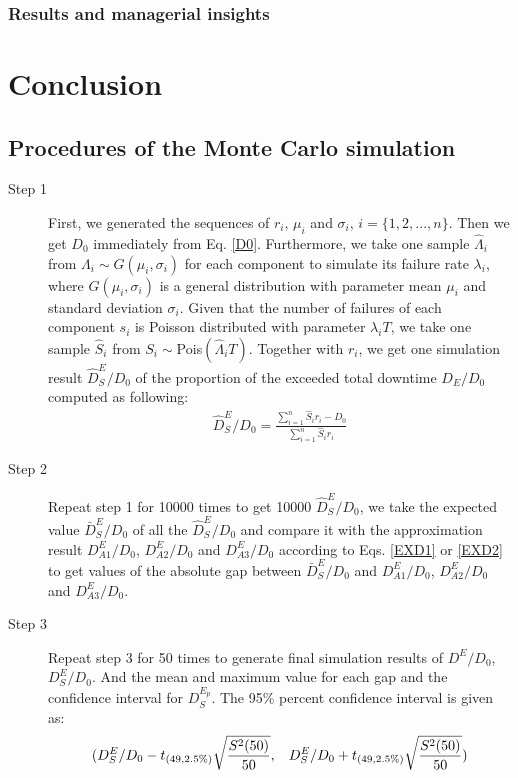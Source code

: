 \documentclass[preprint,12pt]{elsarticle}
\begin{document}
\subsubsection{Results and managerial insights}

\section{Conclusion}
\newpage
\begin{appendices}


\section{Procedures of the Monte Carlo simulation}
\label{MCP}
\begin{description}
\item[Step 1]
First, we generated the sequences of $r_{i}$, $\mu_{i}$ and $\sigma_{i}$, $i=\{1,2,...,n\}$. Then we get $D_0$ immediately from Eq. \eqref{D0}. Furthermore, we take one sample $\hat{\Lambda}_{i}$ from $\Lambda_{i} \sim G(\mu_{i},\sigma_{i})$ for each component to simulate its failure rate $\lambda_{i}$, where $G(\mu_{i},\sigma_{i})$ is a general distribution with parameter mean $\mu_{i}$ and standard deviation $\sigma_{i}$. Given that the number of failures of each component $s_{i}$ is Poisson distributed with parameter $\lambda_{i}T$, we take one sample $\hat{S}_{i}$ from $S_{i}\sim$Pois$(\hat{\Lambda}_{i}T)$. Together with $r_{i}$, we get one simulation result $\hat{D}_{S}^{E}/D_{0}$ of the proportion of the exceeded total downtime $D_{E}/D_0$ computed as following:
\begin{eqnarray}
\hat{D}_{S}^{E}/D_{0}=\frac{\sum_{i=1}^{n}{\hat{S}_{i}r_{i}}-D_0}{\sum_{i=1}^{n}{\hat{S}_{i}r_{i}}}
\end{eqnarray}

\item[Step 2]

Repeat step 1 for 10000 times to get 10000 $\hat{D}_{S}^{E}/D_{0}$, we take the expected value $\bar{D}_{S}^{E}/D_{0}$ of all the $\hat{D}_{S}^{E}/D_{0}$ and compare it with the approximation result $D_{A1}^{E}/D_{0}$, $D_{A2}^{E}/D_{0}$ and $D_{A3}^{E}/D_{0}$ according to Eqs. \eqref{EXD1} or \eqref{EXD2}  to get values of the absolute gap between $\bar{D}_{S}^{E}/D_{0}$ and $D_{A1}^{E}/D_{0}$, $D_{A2}^{E}/D_{0}$ and $D_{A3}^{E}/D_{0}$.

\item[Step 3]

Repeat step 3 for 50 times to generate final simulation results of $D^{E}/D_{0}$, $D^{E}_{S}/D_{0}$. And the mean and maximum value for each gap and the confidence interval for $D^{E_{p}}_{S}$. The 95\% percent confidence interval is given as:
$$(D_{S}^{E}/D_{0}-t_{(49,2.5\%)}\sqrt{\frac{S^{2}(50)}{50}},\hspace{3mm}D_{S}^{E}/D_{0}+t_{(49,2.5\%)}\sqrt{\frac{S^{2}(50)}{50}} ) $$


\end{description}
\end{appendices}
\end{document}

